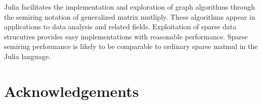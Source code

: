 \documentclass[conference]{IEEEtran}
\begin{document}
Julia facilitates the implementation and exploration of graph algorithms through
the semiring notation of generalized matrix mutliply.  These algorithms appear
in applications to data analysis and related fields.  Exploitation of sparse data
strucutres provides easy implementations with reasonable performance.
Sparse semiring performance is likely to be comparable to ordinary sparse matmul in the Julia
language.

\section{Acknowledgements}



\end{document}
